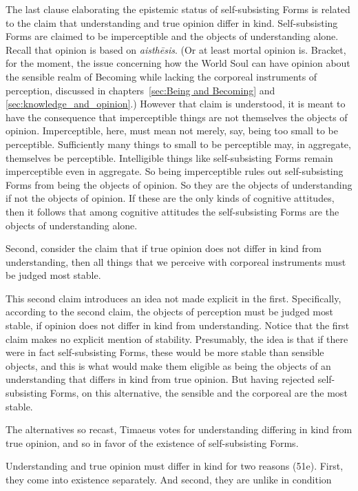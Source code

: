 The last clause elaborating the epistemic status of self-subsisting Forms is related to the claim that understanding and true opinion differ in kind. Self-subsisting Forms are claimed to be imperceptible and the objects of understanding alone. Recall that opinion is based on \emph{aisthēsis}. (Or at least mortal opinion is. Bracket, for the moment, the issue concerning how the World Soul can have opinion about the sensible realm of Becoming while lacking the corporeal instruments of perception, discussed in chapters~\ref{sec:Being and Becoming} and \ref{sec:knowledge_and_opinion}.) However that claim is understood, it is meant to have the consequence that imperceptible things are not themselves the objects of opinion. Imperceptible, here, must mean not merely, say, being too small to be perceptible. Sufficiently many things to small to be perceptible may, in aggregate, themselves be perceptible. Intelligible things like self-subsisting Forms remain imperceptible even in aggregate. So being imperceptible rules out self-subsisting Forms from being the objects of opinion. So they are the objects of understanding if not the objects of opinion. If these are the only kinds of cognitive attitudes, then it follows that among cognitive attitudes the self-subsisting Forms are the objects of understanding alone.

Second, consider the claim that if true opinion does not differ in kind from understanding, then all things that we perceive with corporeal instruments must be judged most stable. 

This second claim introduces an idea not made explicit in the first. Specifically, according to the second claim, the objects of perception must be judged most stable, if opinion does not differ in kind from understanding. Notice that the first claim makes no explicit mention of stability. Presumably, the idea is that if there were in fact self-subsisting Forms, these would be more stable than sensible objects, and this is what would make them eligible as being the objects of an understanding that differs in kind from true opinion. But having rejected self-subsisting Forms, on this alternative, the sensible and the corporeal are the most stable.

The alternatives so recast, Timaeus votes for understanding differing in kind from true opinion, and so in favor of the existence of self-subsisting Forms.

Understanding and true opinion must differ in kind for two reasons (51e). First, they come into existence separately. And second, they are unlike in condition

